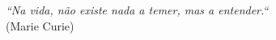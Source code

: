 
\chapter*{}
\vspace{15cm}
\begin{flushright}
	\textit
	{
		``Na vida, não existe nada a temer, mas a entender.``
	}\medskip\\ 
	(Marie Curie)
\end{flushright}